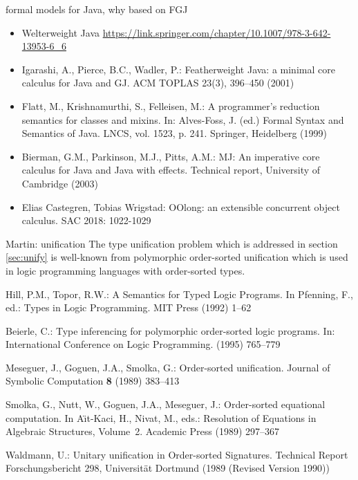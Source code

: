 
formal models for Java, why based on FGJ

\begin{itemize}
\item Welterweight Java
  \url{https://link.springer.com/chapter/10.1007/978-3-642-13953-6_6}
\item Igarashi, A., Pierce, B.C., Wadler, P.: Featherweight Java: a
  minimal core calculus for Java and GJ. ACM TOPLAS 23(3), 396–450
  (2001)
\item Flatt, M., Krishnamurthi, S., Felleisen, M.: A programmer’s
  reduction semantics for classes and mixins. In: Alves-Foss, J. (ed.)
  Formal Syntax and Semantics of Java. LNCS, vol. 1523,
  p. 241. Springer, Heidelberg (1999)
\item Bierman, G.M., Parkinson, M.J., Pitts, A.M.: MJ: An imperative
  core calculus for Java and Java with effects. Technical report,
  University of Cambridge (2003) 
\item 	Elias Castegren, Tobias Wrigstad:
OOlong: an extensible concurrent object calculus. SAC 2018: 1022-1029
\end{itemize}

Martin: unification
The type unification problem which is addressed in section \ref{sec:unify} is
well-known from polymorphic order-sorted unification which is used in logic
programming languages with order-sorted types. 
\begin{thebibliography}{5}
Hill, P.M., Topor, R.W.:
\newblock A {S}emantics for {T}yped {L}ogic {P}rograms.
\newblock In Pfenning, F., ed.: Types in Logic Programming.
\newblock MIT Press (1992)  1--62

Beierle, C.:
\newblock Type inferencing for polymorphic order-sorted logic programs.
\newblock In: International Conference on Logic Programming. (1995)  765--779

Meseguer, J., Goguen, J.A., Smolka, G.:
\newblock Order-sorted unification.
\newblock Journal of Symbolic Computation \textbf{8} (1989)  383--413

Smolka, G., Nutt, W., Goguen, J.A., Meseguer, J.:
\newblock Order-sorted equational computation.
\newblock In A{\"\i}t-Kaci, H., Nivat, M., eds.: Resolution of Equations in
  Algebraic Structures, Volume~2.
\newblock Academic Press (1989)  297--367

Waldmann, U.:
\newblock Unitary unification in {O}rder-sorted {S}ignatures.
\newblock Technical Report Forschungsbericht 298, Universit{\"a}t Dortmund
  (1989 (Revised Version 1990))
\end{thebibliography}


